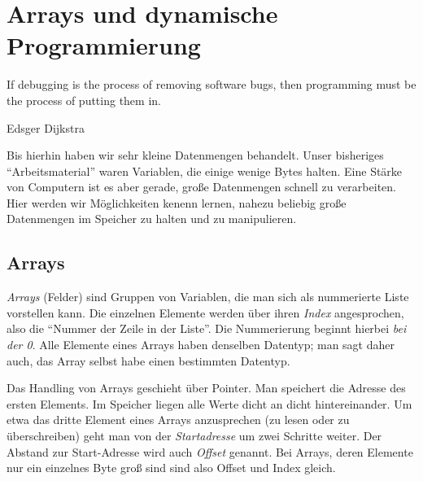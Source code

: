 \chapter{Arrays und dynamische Programmierung}
\epigraph{If debugging is the process of removing software bugs, then programming must be the process of putting them in.}
{Edsger Dijkstra}

Bis hierhin haben wir sehr kleine Datenmengen behandelt. Unser bisheriges \enquote{Arbeitsmaterial} waren Variablen, die einige wenige Bytes halten. Eine Stärke von Computern ist es aber gerade, große Datenmengen schnell zu verarbeiten. Hier werden wir Möglichkeiten kenenn lernen, nahezu beliebig große Datenmengen im Speicher zu halten und zu manipulieren.

\section{Arrays} \label{sec:Arrays}
\emph{Arrays} (Felder) sind Gruppen von Variablen, die man sich als nummerierte Liste vorstellen kann. Die einzelnen Elemente werden über ihren \emph{Index} angesprochen, also die \enquote{Nummer der Zeile in der Liste}. Die Nummerierung beginnt hierbei \emph{bei der 0}. Alle Elemente eines Arrays haben denselben Datentyp; man sagt daher auch, das Array selbst habe einen bestimmten Datentyp.

Das Handling von Arrays geschieht über Pointer. Man speichert die Adresse des ersten Elements. Im Speicher liegen alle Werte dicht an dicht hintereinander. Um etwa das dritte Element eines Arrays anzusprechen (zu lesen oder zu überschreiben) geht man von der \emph{Startadresse} um zwei Schritte weiter. Der Abstand zur Start-Adresse wird auch \emph{Offset} genannt. Bei Arrays, deren Elemente nur ein einzelnes Byte groß sind sind also Offset und Index gleich.

